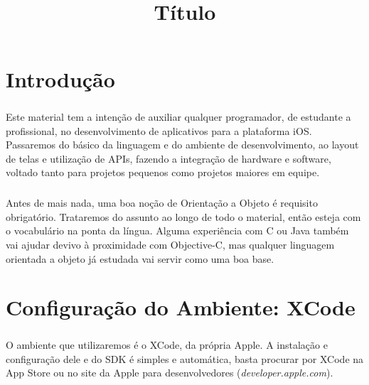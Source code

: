 \documentclass[a4paper,12pt,brazil,doubleside]{book}
\title{Título}
\begin{document}

\cleardoublepage

\onehalfspace

\pagestyle{plain}

\setcounter{tocdepth}{1} %
\tableofcontents
\clearpage %

\lstset{language=[Objective]C}

\listoffigures
{}
\clearpage %
\thispagestyle{empty}

\lstlistoflistings
{}
\clearpage %
\thispagestyle{empty}

\chapter{Introdução}

\paragraph{}Este material tem a intenção de auxiliar qualquer programador, de estudante a profissional, no desenvolvimento de aplicativos para a plataforma iOS. Passaremos do básico da linguagem e do ambiente de desenvolvimento, ao layout de telas e utilização de APIs, fazendo a integração de hardware e software, voltado tanto para projetos pequenos como projetos maiores em equipe.
\paragraph{}Antes de mais nada, uma boa noção de Orientação a Objeto é requisito obrigatório. Trataremos do assunto ao longo de todo o material, então esteja com o vocabulário na ponta da língua. Alguma experiência com C ou Java também vai ajudar devivo à proximidade com Objective-C, mas qualquer linguagem orientada a objeto já estudada vai servir como uma boa base.



\chapter{Configuração do Ambiente: XCode}

\paragraph{}O ambiente que utilizaremos é o XCode, da própria Apple. A instalação e configuração dele e do SDK é simples e automática, basta procurar por XCode na App Store ou no site da Apple para desenvolvedores (\textit{developer.apple.com}).
\end{document}
